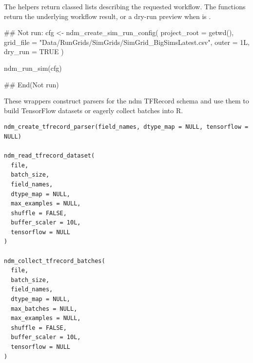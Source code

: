 \documentclass[a4paper]{book}
\begin{document}
%
\begin{Value}
The  helpers return classed lists describing
the requested workflow. The  functions return the underlying
workflow result, or a dry-run preview when  is .
\end{Value}
%
\begin{Examples}
\begin{ExampleCode}
## Not run: 
cfg <- ndm_create_sim_run_config(
  project_root = getwd(),
  grid_file = "Data/RunGrids/SimGrids/SimGrid_BigSimsLatest.csv",
  outer = 1L,
  dry_run = TRUE
)

ndm_run_sim(cfg)

## End(Not run)
\end{ExampleCode}
\end{Examples}
%
\begin{Description}
These wrappers construct parsers for the ndm TFRecord schema and use
them to build TensorFlow datasets or eagerly collect batches into R.
\end{Description}
%
\begin{Usage}
\begin{verbatim}
ndm_create_tfrecord_parser(field_names, dtype_map = NULL, tensorflow = NULL)

ndm_read_tfrecord_dataset(
  file,
  batch_size,
  field_names,
  dtype_map = NULL,
  max_examples = NULL,
  shuffle = FALSE,
  buffer_scaler = 10L,
  tensorflow = NULL
)

ndm_collect_tfrecord_batches(
  file,
  batch_size,
  field_names,
  dtype_map = NULL,
  max_batches = NULL,
  max_examples = NULL,
  shuffle = FALSE,
  buffer_scaler = 10L,
  tensorflow = NULL
)
\end{verbatim}
\end{Usage}
%
\end{document}
